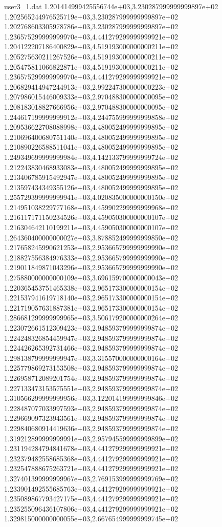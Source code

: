 \begin{filecontents}{user3_1.dat}
1.201414999425556744e+03,3.230287999999999897e+02
1.202565244976525719e+03,3.230287999999999897e+02
1.202768603305978786e+03,3.230287999999999897e+02
1.236575299999999970e+03,4.441279299999999921e+02
1.204122207186400829e+03,4.519193000000000211e+02
1.205275630211267526e+03,4.519193000000000211e+02
1.205475811066822871e+03,4.519193000000000211e+02
1.236575299999999970e+03,4.441279299999999921e+02
1.206829414947244913e+03,2.992247300000000223e+02
1.207986015446009333e+03,2.970488300000000095e+02
1.208183018827666956e+03,2.970488300000000095e+02
1.244617199999999912e+03,4.244755999999999858e+02
1.209536622708088998e+03,4.480052499999999895e+02
1.210696400680751140e+03,4.480052499999999895e+02
1.210890226588511041e+03,4.480052499999999895e+02
1.249349699999999984e+03,4.142133799999999724e+02
1.212243830468933083e+03,4.480052499999999895e+02
1.213406785915492947e+03,4.480052499999999895e+02
1.213597434349355126e+03,4.480052499999999895e+02
1.255729399999999941e+03,4.020835000000000150e+02
1.214951038229777168e+03,4.459902299999999968e+02
1.216117171150234526e+03,4.459050300000000107e+02
1.216304642110199211e+03,4.459050300000000107e+02
1.264360400000000027e+03,3.878852499999999850e+02
1.217658245990621253e+03,2.953665799999999990e+02
1.218827556384976333e+03,2.953665799999999990e+02
1.219011849871043296e+03,2.953665799999999990e+02
1.275880000000000109e+03,3.696159700000000043e+02
1.220365453751465338e+03,2.965173300000000154e+02
1.221537941619718140e+03,2.965173300000000154e+02
1.221719057631887381e+03,2.965173300000000154e+02
1.286681299999999965e+03,3.506179200000000264e+02
1.223072661512309423e+03,2.948593799999999874e+02
1.224248326854459947e+03,2.948593799999999874e+02
1.224426265392731466e+03,2.948593799999999874e+02
1.298138799999999947e+03,3.315570000000000164e+02
1.225779869273153508e+03,2.948593799999999874e+02
1.226958712089201754e+03,2.948593799999999874e+02
1.227133473153575551e+03,2.948593799999999874e+02
1.310566299999999956e+03,3.122014199999999846e+02
1.228487077033997593e+03,2.948593799999999874e+02
1.229669097323943561e+03,2.948593799999999874e+02
1.229840680914419636e+03,2.948593799999999874e+02
1.319212899999999991e+03,2.957945599999999899e+02
1.231194284794841678e+03,4.441279299999999921e+02
1.232379482558685368e+03,4.441279299999999921e+02
1.232547888675263721e+03,4.441279299999999921e+02
1.327401399999999967e+03,2.769153999999999769e+02
1.233901492555685763e+03,4.441279299999999921e+02
1.235089867793427175e+03,4.441279299999999921e+02
1.235255096436107806e+03,4.441279299999999921e+02
1.329815000000000055e+03,2.667654999999999745e+02

\end{filecontents}
